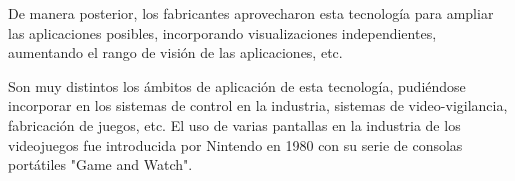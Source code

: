 De manera posterior, los fabricantes aprovecharon esta tecnología para ampliar las aplicaciones posibles, incorporando visualizaciones independientes, aumentando el rango de visión de las aplicaciones, etc.

Son muy distintos los ámbitos de aplicación de esta tecnología, pudiéndose incorporar en los sistemas de control en la industria, sistemas de video-vigilancia, fabricación de juegos, etc.
El uso de varias pantallas en la industria de los videojuegos fue introducida por Nintendo en 1980 con su serie de consolas portátiles "Game and Watch".

